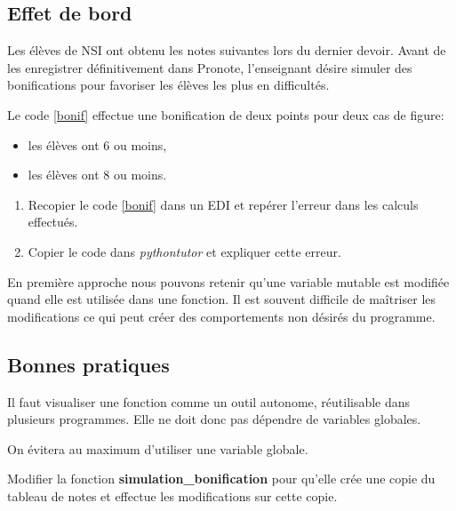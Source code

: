 \documentclass[a4paper,11pt]{article}
\begin{document}
\begin{Form}
\subsection{Effet de bord}
Les élèves de NSI ont obtenu les notes suivantes lors du dernier devoir. Avant de les enregistrer définitivement dans Pronote, l'enseignant désire simuler des bonifications pour favoriser les élèves les plus en difficultés.
\begin{center}

\label{bonif}
\end{center}
Le code \ref{bonif} effectue une bonification de deux points pour deux cas de figure:
\begin{itemize}
\item les élèves ont 6 ou moins,
\item les élèves ont 8 ou moins.
\end{itemize}
\begin{activite}
\begin{enumerate}
\item Recopier le code \ref{bonif} dans un EDI et repérer l'erreur dans les calculs effectués.
\item Copier le code dans \emph{pythontutor} et expliquer cette erreur.
\end{enumerate}
\end{activite}
\begin{aretenir}
En première approche nous pouvons retenir qu'une variable mutable est modifiée quand elle est utilisée dans une fonction. Il est souvent difficile de maîtriser les modifications ce qui peut créer des comportements non désirés du programme.
\end{aretenir}
\subsection{Bonnes pratiques}
Il faut visualiser une fonction comme un outil autonome, réutilisable dans plusieurs programmes. Elle ne doit donc pas dépendre de variables globales.
\begin{aretenir}[]
On évitera au maximum d'utiliser une variable globale.
\end{aretenir}
\begin{activite}
Modifier la fonction \textbf{simulation\_bonification} pour qu'elle crée une copie du tableau de notes et effectue les modifications sur cette copie.
\end{activite}
\end{Form}
\end{document}
